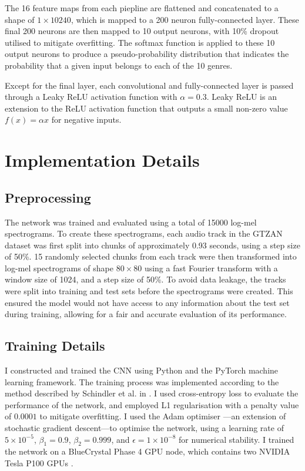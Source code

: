 \documentclass[conference]{IEEEtran}
\begin{document}
The 16 feature maps from each piepline are flattened and concatenated to a shape of $1\times10240$, which is mapped to a 200 neuron fully-connected layer.
These final 200 neurons are then mapped to 10 output neurons, with 10\% dropout utilised to mitigate overfitting.
The softmax function is applied to these 10 output neurons to produce a pseudo-probability distribution that indicates the probability that a given input belongs to each of the 10 genres.

Except for the final layer, each convolutional and fully-connected layer is passed through a Leaky ReLU activation function with $\alpha=0.3$.
Leaky ReLU is an extension to the ReLU activation function that outputs a small non-zero value $f(x) = \alpha x$ for negative inputs.

\section{Implementation Details}

\subsection{Preprocessing}

The network was trained and evaluated using a total of 15000 log-mel spectrograms.
To create these spectrograms, each audio track in the GTZAN dataset was first split into chunks of approximately 0.93 seconds, using a step size of 50\%.
15 randomly selected chunks from each track were then transformed into log-mel spectrograms of shape $80\times80$ using a fast Fourier transform with a window size of 1024, and a step size of 50\%.
To avoid data leakage, the tracks were split into training and test sets before the spectrograms were created.
This ensured the model would not have access to any information about the test set during training, allowing for a fair and accurate evaluation of its performance.

\subsection{Training Details}

I constructed and trained the CNN using Python and the PyTorch \cite{PyTorch} machine learning framework.
The training process was implemented according to the method described by Schindler et al. in \cite{SchindlerLidyRauber}.
I used cross-entropy loss to evaluate the performance of the network, and employed L1 regularisation with a penalty value of $0.0001$ to mitigate overfitting.
I used the Adam optimiser \cite{KingmaBa}---an extension of stochastic gradient descent---to optimise the network, using a learning rate of $5\times10^{-5}$, $\beta_1=0.9$, $\beta_2=0.999$, and $\epsilon=1\times10^{-8}$ for numerical stability.
I trained the network on a BlueCrystal Phase 4 GPU node, which contains two NVIDIA Tesla P100 GPUs \cite{bc4}.
\end{document}
